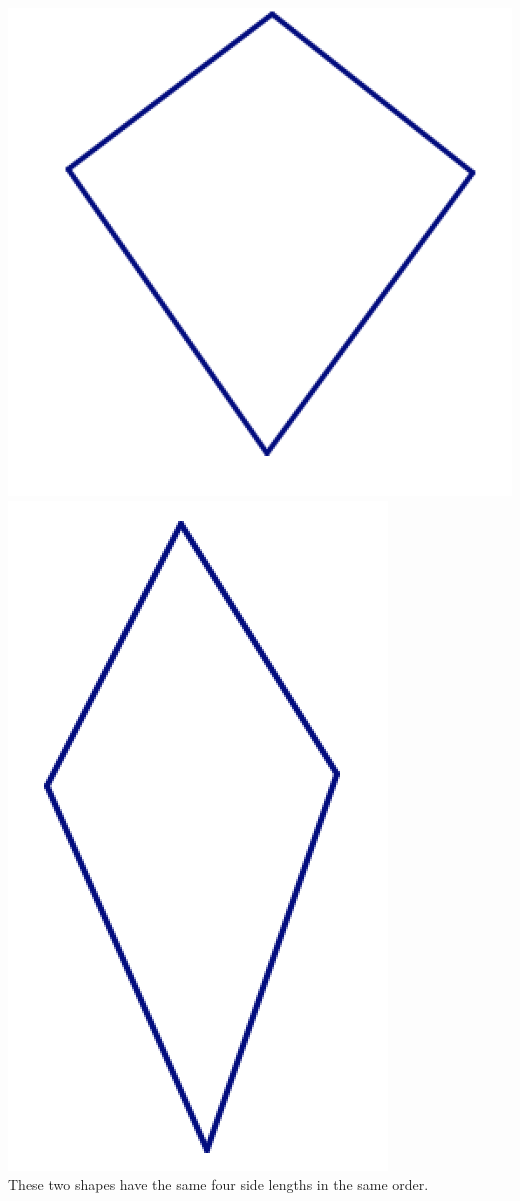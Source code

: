 \documentclass[12pt, reqno]{amsart}
\theoremstyle{remark}
\theoremstyle{definition}
\numberwithin{equation}{section}  %
\begin{document}
\begin{center}
\includegraphics[scale = .45]{kite1}
\qquad\qquad
\includegraphics[scale = .45]{kite2}\\
 These two shapes have the same four side lengths in the same order.


\end{center}
\end{document}
